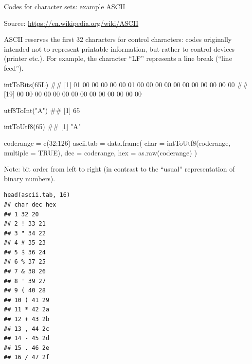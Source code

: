 \begin{vbframe}{Codes for character sets: example ASCII}
\begin{center}
{\scriptsize Source: \url{https://en.wikipedia.org/wiki/ASCII}}
\end{center}

{\footnotesize ASCII reserves the first 32 characters for control characters: codes originally intended not to represent printable information, but rather to control devices (printer etc.).
For example, the character \enquote{LF} represents a line break (\enquote{line feed}).}

\framebreak
\vspace*{-0.5cm}
\footnotesize
\begin{verbbox}
intToBits(65L)
## [1] 01 00 00 00 00 00 01 00 00 00 00 00 00 00 00 00 00 00
## [19] 00 00 00 00 00 00 00 00 00 00 00 00 00 00
\end{verbbox}
\col
\vspace{0.2cm}
\begin{verbbox}
utf8ToInt("A")
## [1] 65
\end{verbbox}
\col
\vspace{0.2cm}
\begin{verbbox}
intToUtf8(65)
## [1] "A"

coderange = c(32:126)
ascii.tab = data.frame(
  char = intToUtf8(coderange, multiple = TRUE),
  dec = coderange,
  hex = as.raw(coderange)
)
\end{verbbox}
\col
\lz
\begin{footnotesize}
Note: bit order from left to right (in contrast to the \enquote{usual} representation of binary numbers).
\end{footnotesize}

\framebreak

\footnotesize
\begin{verbatim}
head(ascii.tab, 16)
## char dec hex
## 1 32 20
## 2 ! 33 21
## 3 " 34 22
## 4 # 35 23
## 5 $ 36 24
## 6 % 37 25
## 7 & 38 26
## 8 ' 39 27
## 9 ( 40 28
## 10 ) 41 29
## 11 * 42 2a
## 12 + 43 2b
## 13 , 44 2c
## 14 - 45 2d
## 15 . 46 2e
## 16 / 47 2f
\end{verbatim}

\end{vbframe}



\normalsize

